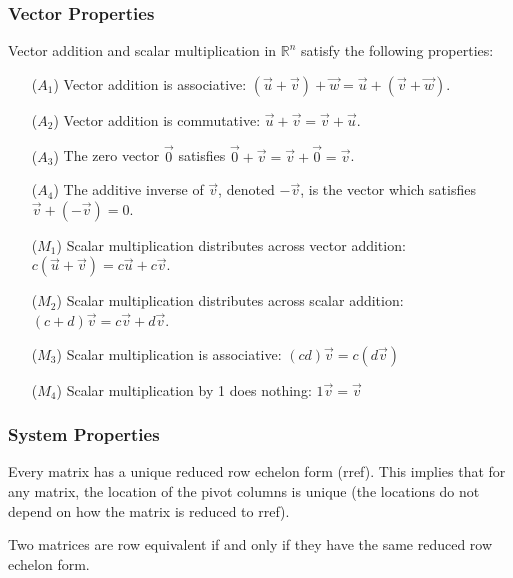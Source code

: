 \subsubsection{Vector Properties}
\begin{theorem}\label{rn vector space properties}
Vector addition and scalar multiplication in $\mathbb{R}^n$ satisfy the following properties:
\begin{enumerate}
	\item[($A_1$)] Vector addition is associative: $(\vec u+\vec v)+\vec w = \vec u +(\vec v+\vec w)$.
	\item[($A_2$)] Vector addition is commutative: $\vec u+\vec v= \vec v+\vec u$.
	\item[($A_3$)] The zero vector $\vec 0$ satisfies $\vec 0+\vec v = \vec v+\vec 0=\vec v$.
	\item[($A_4$)] The additive inverse of $\vec v$, denoted $-\vec v$, is the vector which satisfies $\vec v+(-\vec v)=0$.
	\item[($M_1$)] Scalar multiplication distributes across vector addition: $c(\vec u+\vec v)= c\vec u + c\vec v$.
	\item[($M_2$)] Scalar multiplication distributes across scalar addition: $(c+d)\vec v= c\vec v+ d\vec v$.
	\item[($M_3$)] Scalar multiplication is associative: $(cd)\vec v = c(d\vec v)$
	\item[($M_4$)] Scalar multiplication by 1 does nothing: $1\vec v=\vec v$
\end{enumerate}
\end{theorem}

\subsubsection{System Properties}
 
\begin{theorem}\label{thm unique rref}
Every matrix has a unique reduced row echelon form (rref). This implies that for any matrix, the location of the pivot columns is unique (the locations do not depend on how the matrix is reduced to rref). 
\end{theorem}

\begin{theorem}\label{thm row equivalent}
Two matrices are row equivalent if and only if they have the same reduced row echelon form.
\end{theorem}


